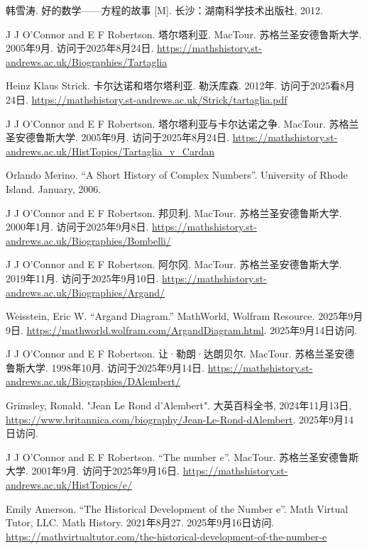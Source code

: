 韩雪涛. 好的数学——方程的故事 [M]. 长沙：湖南科学技术出版社, 2012. %

J J O'Connor and E F Robertson. 塔尔塔利亚. MacTour. 苏格兰圣安德鲁斯大学. 2005年9月. 访问于2025年8月24日. \url{https://mathshistory.st-andrews.ac.uk/Biographies/Tartaglia}

Heinz Klaus Strick. 卡尔达诺和塔尔塔利亚. 勒沃库森. 2012年. 访问于2025看8月24日. \url{https://mathshistory.st-andrews.ac.uk/Strick/tartaglia.pdf}

J J O'Connor and E F Robertson. 塔尔塔利亚与卡尔达诺之争. MacTour. 苏格兰圣安德鲁斯大学. 2005年9月. 访问于2025年8月24日. \url{https://mathshistory.st-andrews.ac.uk/HistTopics/Tartaglia_v_Cardan} %

Orlando Merino. ``A Short History of Complex Numbers''. University of Rhode Island. January, 2006.

J J O'Connor and E F Robertson. 邦贝利. MacTour. 苏格兰圣安德鲁斯大学. 2000年1月. 访问于2025年9月8日. \url{https://mathshistory.st-andrews.ac.uk/Biographies/Bombelli/}

J J O'Connor and E F Robertson. 阿尔冈. MacTour. 苏格兰圣安德鲁斯大学. 2019年11月. 访问于2025年9月10日. \url{https://mathshistory.st-andrews.ac.uk/Biographies/Argand/}

Weisstein, Eric W. ``Argand Diagram.'' MathWorld, Wolfram Resource. 2025年9月9日. \url{https://mathworld.wolfram.com/ArgandDiagram.html}. 2025年9月14日访问.

J J O'Connor and E F Robertson. 让·勒朗·达朗贝尔. MacTour. 苏格兰圣安德鲁斯大学. 1998年10月. 访问于2025年9月14日. \url{https://mathshistory.st-andrews.ac.uk/Biographies/DAlembert/}

Grimsley, Ronald. "Jean Le Rond d’Alembert". 大英百科全书, 2024年11月13日, \url{https://www.britannica.com/biography/Jean-Le-Rond-dAlembert}. 2025年9月14日访问.

J J O'Connor and E F Robertson. ``The number $e$''. MacTour. 苏格兰圣安德鲁斯大学. 2001年9月. 访问于2025年9月16日. \url{https://mathshistory.st-andrews.ac.uk/HistTopics/e/}

Emily Amerson. ``The Historical Development of the Number e''. Math Virtual Tutor, LLC. Math History. 2021年8月27. 2025年9月16日访问. \url{https://mathvirtualtutor.com/the-historical-development-of-the-number-e}

